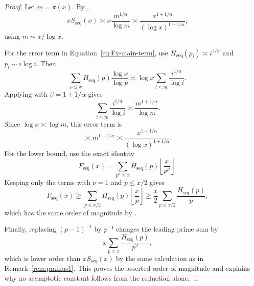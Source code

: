 \documentclass[10pt,a4paper]{amsart}
\newcommand{\height}{H}
\begin{document}
\begin{proof}
Let $m=\pi(x)$.  By ,
\[
  xS_{\mathrm{seq}}(x)
  \asymp
  x\frac{m^{1/\alpha}}{\log m}
  \asymp
  \frac{x^{1+1/\alpha}}{(\log x)^{1+1/\alpha}},
\]
using $m\sim x/\log x$.

For the error term in Equation~\eqref{eq:Fx-main-term}, use
$\height_{\mathrm{seq}}(p_i)\asymp i^{1/\alpha}$ and
$p_i\sim i\log i$.  Then
\[
\sum_{p\le x}\height_{\mathrm{seq}}(p)\frac{\log x}{\log p}
\asymp
\log x\sum_{i\le m}\frac{i^{1/\alpha}}{\log i}.
\]
Applying  with $\beta=1+1/\alpha$ gives
\[
\sum_{i\le m}\frac{i^{1/\alpha}}{\log i}
\asymp
\frac{m^{1+1/\alpha}}{\log m}.
\]
Since $\log x\asymp\log m$, this error term is
\[
  \asymp m^{1+1/\alpha}
  \asymp
  \frac{x^{1+1/\alpha}}{(\log x)^{1+1/\alpha}}.
\]
For the lower bound, use the exact identity
\[
  F_{\mathrm{seq}}(x)
  =
  \sum_{p^\nu\le x}
  \height_{\mathrm{seq}}(p)
  \left\lfloor \frac{x}{p^\nu}\right\rfloor.
\]
Keeping only the terms with $\nu=1$ and $p\le x/2$ gives
\[
  F_{\mathrm{seq}}(x)
  \ge
  \sum_{p\le x/2}
  \height_{\mathrm{seq}}(p)
  \left\lfloor \frac{x}{p}\right\rfloor
  \ge
  \frac{x}{2}
  \sum_{p\le x/2}\frac{\height_{\mathrm{seq}}(p)}p,
\]
which has the same order of magnitude by .

Finally, replacing $(p-1)^{-1}$ by $p^{-1}$ changes the leading prime sum by
\[
  x\sum_{p\le x}\frac{\height_{\mathrm{seq}}(p)}{p^2},
\]
which is lower order than $xS_{\mathrm{seq}}(x)$ by the same calculation as in
Remark~\ref{rem:pminus1}.  This proves the asserted order of magnitude and
explains why no asymptotic constant follows from the reduction alone.
\end{proof}
\end{document}
